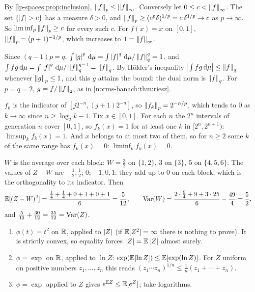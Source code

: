 By \cref{lp-spaces:prop:inclusion}, $\left\|f\right\|_p\leq\left\|f\right\|_\infty$.
Conversely let $0\leq c < \left\|f\right\|_\infty$. The set $\{\left|f\right| > c\}$ has
a measure $\delta > 0$, and
$\left\|f\right\|_p\geq(c^p\delta)^{1/p} = c\,\delta^{1/p}\to c$ as
$p\to\infty$. So $\liminf_p\left\|f\right\|_p\geq c$ for every such $c$. For
$f(x) = x$ on $[0, 1]$, $\left\|f\right\|_p = (p + 1)^{-1/p}$, which increases
to $1 = \left\|f\right\|_\infty$.

Since $(q - 1)p = q$,
$\int\left|g\right|^p\,\mathrm{d}\mu
= \int\left|f\right|^q\,\mathrm{d}\mu/\left\|f\right\|_q^{q} = 1$, and
$\int fg\,\mathrm{d}\mu = \int\left|f\right|^q\,\mathrm{d}\mu/\left\|f\right\|_q^{q-1} = \left\|f\right\|_q$. By
H\"older's inequality $\left|\int fg\,\mathrm{d}\mu\right|\leq\left\|f\right\|_q$ whenever
$\left\|g\right\|_p\leq1$, and this $g$ attains the bound: the dual norm is
$\left\|f\right\|_q$. For $p = q = 2$, $g = f/\left\|f\right\|_2$, as in
\cref{norms-banach:thm:riesz}.

$f_k$ is the indicator of $[j2^{-n}, (j + 1)2^{-n}]$, so
$\left\|f_k\right\|_p = 2^{-n/p}$, which tends to $0$ as $k\to\infty$ since
$n\geq\log_2k - 1$. Fix $x\in[0, 1]$. For each $n$ the $2^n$ intervals
of generation $n$ cover $[0, 1]$, so $f_k(x) = 1$ for at least one $k$
in $[2^n, 2^{n+1})$: $\limsup_kf_k(x) = 1$. And $x$ belongs to at most
two of them, so for $n\geq2$ some $k$ of the same range has
$f_k(x) = 0$: $\liminf_kf_k(x) = 0$.

$W$ is the average over each block: $W = \frac32$ on $\{1, 2\}$, $3$ on
$\{3\}$, $5$ on $\{4, 5, 6\}$. The values of $Z - W$ are
$-\frac12, \frac12$; $0$; $-1, 0, 1$: they add up to $0$ on each block,
which is the orthogonality to its indicator. Then
\[
  \mathbb{E}[(Z - W)^2] = \frac{\frac14 + \frac14 + 0 + 1 + 0 + 1}6 = \frac5{12} ,
  \qquad
  \operatorname{Var}(W) = \frac{2\cdot\frac94 + 9 + 3\cdot25}6 - \frac{49}4
  = \frac52 ,
\]
and $\frac5{12} + \frac{30}{12} = \frac{35}{12} = \operatorname{Var}(Z)$.

\begin{enumerate}[nosep]
  \item $\phi(t) = t^2$ on $\mathbb{R}$, applied to $\left|Z\right|$ (if
        $\mathbb{E}[Z^2] = \infty$ there is nothing to prove). It is strictly
        convex, so equality forces $\left|Z\right| = \mathbb{E}\left|Z\right|$ almost surely.
  \item $\phi = \exp$ on $\mathbb{R}$, applied to $\ln Z$:
        $\exp(\mathbb{E}[\ln Z])\leq\mathbb{E}[\exp(\ln Z)]$. For $Z$ uniform on
        positive numbers $z_1,\dots,z_n$ this reads
        $(z_1\cdots z_n)^{1/n}\leq\frac1n(z_1 + \cdots + z_n)$.
  \item $\phi = \exp$ applied to $Z$ gives $e^{\mathbb{E} Z}\leq\mathbb{E}[e^Z]$; take
        logarithms.
\end{enumerate}

